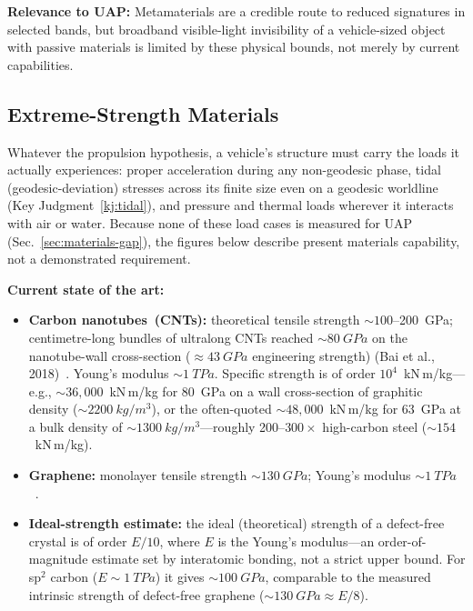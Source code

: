 \documentclass[aps,prd,twocolumn,superscriptaddress,nofootinbib,floatfix]{revtex4-2}
\begin{document}
\textbf{Relevance to UAP:} Metamaterials are a credible route to reduced
signatures in selected bands, but broadband visible-light invisibility of a
vehicle-sized object with passive materials is limited by these physical bounds,
not merely by current capabilities.

\subsection{Extreme-Strength Materials}\label{sec:extreme-materials}

Whatever the propulsion hypothesis, a vehicle's structure must carry the loads it
actually experiences: proper acceleration during any non-geodesic phase, tidal
(geodesic-deviation) stresses across its finite size even on a geodesic worldline
(Key Judgment~\ref{kj:tidal}), and pressure and thermal loads wherever it
interacts with air or water. Because none of these load cases is measured for UAP
(Sec.~\ref{sec:materials-gap}), the figures below describe present materials
capability, not a demonstrated requirement.

\textbf{Current state of the art:}
\begin{itemize}
  \item \textbf{Carbon nanotubes~(CNTs):} theoretical tensile strength
        ${\sim}100$--\SI{200}{GPa}; centimetre-long bundles of ultralong CNTs
        reached ${\sim}\SI{80}{GPa}$ on the nanotube-wall cross-section
        (${\approx}\SI{43}{GPa}$ engineering strength) (Bai et al.,
        2018)~\cite{Bai2018}. Young's modulus ${\sim}\SI{1}{TPa}$. Specific
        strength is of order $10^{4}$~kN\,m/kg---e.g., ${\sim}36{,}000$~kN\,m/kg
        for \SI{80}{GPa} on a wall cross-section of graphitic density
        (${\sim}\SI{2200}{kg/m^{3}}$), or the often-quoted
        ${\sim}48{,}000$~kN\,m/kg for \SI{63}{GPa} at a bulk density of
        ${\sim}\SI{1300}{kg/m^{3}}$---roughly 200--$300\times$ high-carbon steel
        (${\sim}154$~kN\,m/kg).
  \item \textbf{Graphene:} monolayer tensile strength ${\sim}\SI{130}{GPa}$;
        Young's modulus ${\sim}\SI{1}{TPa}$~\cite{Lee2008}.
  \item \textbf{Ideal-strength estimate:} the ideal (theoretical) strength of a
        defect-free crystal is of order $E/10$, where $E$ is the Young's
        modulus---an order-of-magnitude estimate set by interatomic bonding, not
        a strict upper bound. For sp$^{2}$ carbon ($E\sim\SI{1}{TPa}$) it gives
        ${\sim}\SI{100}{GPa}$, comparable to the measured intrinsic strength of
        defect-free graphene (${\sim}\SI{130}{GPa}\approx E/8$).
\end{itemize}
\end{document}
